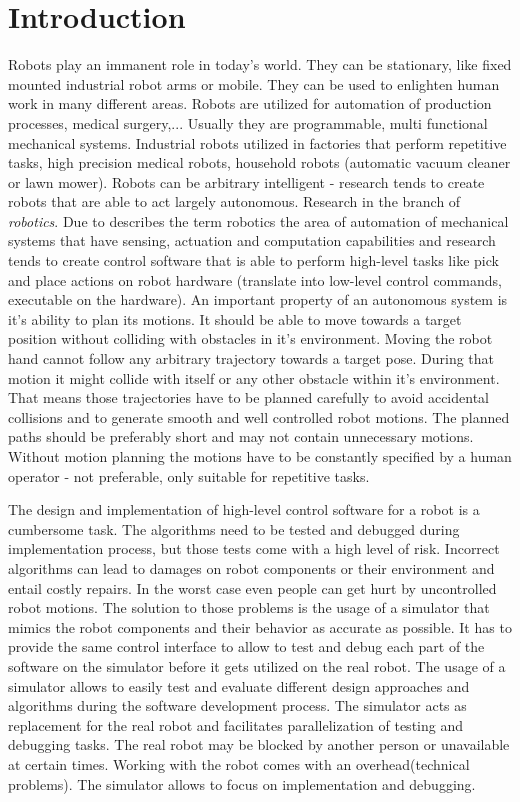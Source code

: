 
\chapter{Introduction}
\label{chap:introduction}

Robots play an immanent role in today's world. They can be stationary, like fixed mounted industrial robot arms or mobile. They can be used to enlighten human work in many different areas. Robots are utilized for automation of production processes, medical surgery,...
Usually they are programmable, multi functional mechanical systems.
Industrial robots utilized in factories that perform repetitive tasks, high precision medical robots, household robots (automatic vacuum cleaner or lawn mower). Robots can be arbitrary intelligent - research tends to create robots that are able to act largely autonomous. Research in the branch of \emph{robotics}. Due to \citep{lavalle2006} describes the term robotics the area of automation of mechanical systems that have sensing, actuation and computation capabilities and research tends to create control software that is able to perform high-level tasks like pick and place actions on robot hardware (translate into low-level control commands, executable on the hardware). An important property of an autonomous system is it's ability to plan its motions. It should be able to move towards a target position without colliding with obstacles in it's environment. Moving the robot hand cannot follow any arbitrary trajectory towards a target pose. During that motion it might collide with itself or any other obstacle within it's environment. That means those trajectories have to be planned carefully to avoid accidental collisions and to generate smooth and well controlled robot motions. The planned paths should be preferably short and may not contain unnecessary motions. Without motion planning the motions have to be constantly specified by a human operator - not preferable, only suitable for repetitive tasks.

The design and implementation of high-level control software for a robot is a cumbersome task. The algorithms need to be tested and debugged during implementation process, but those tests come with a high level of risk. Incorrect algorithms can lead to damages on robot components or their environment and entail costly repairs. In the worst case even people can get hurt by uncontrolled robot motions. The solution to those problems is the usage of a simulator that mimics the robot components and their behavior as accurate as possible. It has to provide the same control interface to allow to test and debug each part of the software on the simulator before it gets utilized on the real robot. The usage of a simulator allows to easily test and evaluate different design approaches and algorithms during the software development process. The simulator acts as replacement for the real robot and facilitates parallelization of testing and debugging tasks. The real robot may be blocked by another person or unavailable at certain times. Working with the robot comes with an overhead(technical problems). The simulator allows to focus on implementation and debugging.

